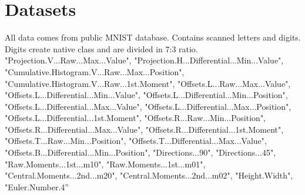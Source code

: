 \chapter{Datasets} \label{datasets}

All data comes from public MNIST database. Contains scanned letters and digits. Digits create native class and are divided in 7:3 ratio.
"Projection.V...Raw...Max...Value",
"Projection.H...Differential...Min...Value",
"Cumulative.Histogram.V...Raw...Max...Position",
"Cumulative.Histogram.V...Raw...1st.Moment",
"Offsets.L...Raw...Max...Value",
"Offsets.L...Differential...Min...Value",
"Offsets.L...Differential...Min...Position",
"Offsets.L...Differential...Max...Value",
"Offsets.L...Differential...Max...Position",
"Offsets.L...Differential...1st.Moment",
"Offsets.R...Raw...Min...Position",
"Offsets.R...Differential...Max...Value",
"Offsets.R...Differential...1st.Moment",
"Offsets.T...Raw...Min...Position",
"Offsets.T...Differential...Max...Value",
"Offsets.B...Differential...Min...Position",
"Directions...90",
"Directions...45",
"Raw.Moments...1st...m10",
"Raw.Moments...1st...m01",
"Central.Moments...2nd...m20",
"Central.Moments...2nd...m02",
"Height.Width",
"Euler.Number.4”  
